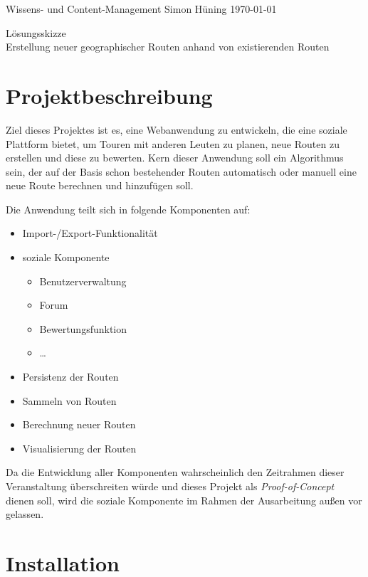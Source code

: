 \documentclass[a4paper,11pt,utf8]{scrartcl}
\begin{document}
\pagestyle{empty}

\noindent
Wissens- und Content-Management \hfill Simon Hüning \hfill \today\vspace{-.4cm}\\
\begin{center}
\huge\textsf{Lösungsskizze}\vspace{.1cm}\\
\large Erstellung neuer geographischer Routen anhand von existierenden Routen
\end{center}

\section{Projektbeschreibung}

Ziel dieses Projektes ist es, eine Webanwendung zu entwickeln, die eine soziale Plattform bietet, um Touren mit anderen Leuten zu planen, neue Routen zu erstellen und diese zu bewerten. Kern dieser Anwendung soll ein Algorithmus sein, der auf der Basis schon bestehender Routen automatisch oder manuell eine neue Route berechnen und hinzufügen soll. 

Die Anwendung teilt sich in folgende Komponenten auf:

\begin{itemize}
	\item Import-/Export-Funktionalität
	\item soziale Komponente
		\begin{itemize}[label=$\bullet$]
			\item Benutzerverwaltung
			\item Forum
			\item Bewertungsfunktion
			\item \dots{}
		\end{itemize}
	\item Persistenz der Routen
	\item Sammeln von Routen
	\item Berechnung neuer Routen
	\item Visualisierung der Routen
\end{itemize}

Da die Entwicklung aller Komponenten wahrscheinlich den Zeitrahmen dieser Veranstaltung überschreiten würde und dieses Projekt als \textit{Proof-of-Concept} dienen soll, wird die \glqq soziale Komponente\grqq{} im Rahmen der Ausarbeitung außen vor gelassen.

\section{Installation}
\end{document}
